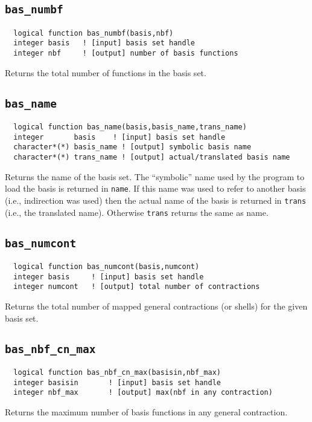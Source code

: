 \subsection{{\tt bas\_numbf}}
\begin{verbatim}
  logical function bas_numbf(basis,nbf)
  integer basis   ! [input] basis set handle         
  integer nbf     ! [output] number of basis functions
\end{verbatim}
Returns the total number of functions in the basis set.

\subsection{{\tt bas\_name}}
\begin{verbatim}
  logical function bas_name(basis,basis_name,trans_name)
  integer       basis    ! [input] basis set handle
  character*(*) basis_name ! [output] symbolic basis name
  character*(*) trans_name ! [output] actual/translated basis name
\end{verbatim}
Returns the name of the basis set.  The ``symbolic'' name used by the
program to load the basis is returned in {\tt name}.  If this name was
used to refer to another basis (i.e., indirection was used) then the
actual name of the basis is returned in {\tt trans} (i.e., the
translated name).  Otherwise {\tt trans} returns the same as name.

\subsection{{\tt bas\_numcont}}
\begin{verbatim}
  logical function bas_numcont(basis,numcont)
  integer basis     ! [input] basis set handle
  integer numcont   ! [output] total number of contractions
\end{verbatim}
Returns the total number of mapped general contractions (or shells)
for the given basis set.

\subsection{{\tt bas\_nbf\_cn\_max}}
\begin{verbatim}
  logical function bas_nbf_cn_max(basisin,nbf_max)
  integer basisin       ! [input] basis set handle
  integer nbf_max       ! [output] max(nbf in any contraction)
\end{verbatim}
Returns the maximum number of basis functions in any general contraction.

